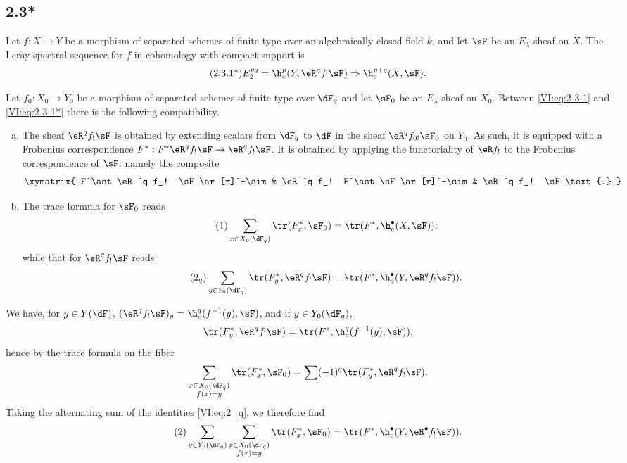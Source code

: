 \subsection*{2.3*}\label{VI:2-3*}

Let $f:X\to Y$ be a morphism of separated schemes of finite type over an 
algebraically closed field $k$, and let $\sF$ be an $E_\lambda$-sheaf on $X$. The 
Leray spectral sequence for $f$ in cohomology with compact support is 
\begin{align*}\tag{2.3.1*}\label{VI:eq:2-3-1*}
  E_2^{p q} = \h_c^p(Y,\eR^q f_! \sF) \Rightarrow \h_c^{p+q}(X,\sF) \text{.}
\end{align*}

Let $f_0:X_0 \to Y_0$ be a morphism of separated schemes of finite type over 
$\dF_q$ and let $\sF_0$ be an $E_\lambda$-sheaf on $X_0$. Between 
\eqref{VI:eq:2-3-1} and \eqref{VI:eq:2-3-1*} there is the following compatibility. 

\begin{enumerate}[a)]
  \item The sheaf $\eR^q f_! \sF$ is obtained by extending scalars from 
    $\dF_q$ to $\dF$ in the sheaf $\eR^q f_{0!} \sF_0$ on $Y_0$. As 
    such, it is equipped with a Frobenius correspondence 
    $F^\ast:F^\ast\eR^q f_! \sF \to \eR^q f_! \sF$. It is obtained by applying 
    the functoriality of $\eR f_!$ to the Frobenius correspondence of $\sF$: 
    namely the composite 
    \[\xymatrix{
      F^\ast \eR^q f_! \sF \ar[r]^-\sim 
        & \eR^q f_! F^\ast \sF \ar[r]^-\sim 
        & \eR^q f_! \sF \text{.}
    }\]
  \item The trace formula for $\sF_0$ reads 
    \begin{align*}\tag{1}\label{VI:eq:1}
      \sum_{x\in X_0(\dF_q)} \tr(F_x^\ast,\sF_0) = \tr(F^\ast,\h_c^\bullet(X,\sF)) \text{;}
    \end{align*}
    while that for $\eR^q f_! \sF$ reads 
    \begin{align*}\tag{2$_q$}\label{VI:eq:2_q} 
      \sum_{y\in Y_0(\dF_q)} \tr(F_y^\ast,\eR^q f_! \sF) = \tr(F^\ast, \h_c^\bullet(Y,\eR^q f_! \sF)) \text{.}
    \end{align*}
\end{enumerate}

We have, for $y\in Y(\dF)$, $(\eR^q f_! \sF)_y = \h_c^q(f^{-1}(y),\sF)$, and if 
$y\in Y_0(\dF_q)$, 
\[
  \tr(F_y^\ast,\eR^q f_! \sF) = \tr(F^\ast,\h_c^q(f^{-1}(y),\sF)) \text{,}
\]
hence by the trace formula on the fiber 
\[
  \sum_{\substack{x\in X_0(\dF_q) \\ f(x) = y}} \tr(F_x^\ast,\sF_0) = \sum (-1)^q \tr(F_y^\ast,\eR^q f_! \sF) \text{.}
\]
Taking the alternating sum of the identities \eqref{VI:eq:2_q}, we therefore find 
\begin{align*}\tag{2}\label{VI:eq:2}
  \sum_{y\in Y_0(\dF_q)} \sum_{\substack{x \in X_0(\dF_q) \\ f(x) = y}} \tr(F_x^\ast,\sF_0) = \tr(F^\ast,\h_c^\bullet(Y,\eR^\bullet f_! \sF)) \text{.}
\end{align*}

